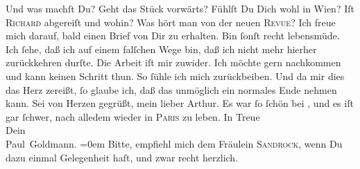 \begin{ledgroupsized}[t]{13cm}
           \pstart
           Und was machſt Du? Geht das Stück
               vorwärts? Fühlſt Du Dich wohl in Wien? Iſt \textsc{Richard} abgereiſt und
               wohin? Was hört man von der neuen \textsc{Revue}?\pend
           \pstart
           {\pb}Ich freue mich darauf, bald einen Brief von Dir zu
               erhalten. Bin ſonſt recht lebensmüde. Ich ſehe, daß ich auf einem falſchen Wege bin,
               daß ich nicht mehr hierher zurückkehren durſte. Die Arbeit iſt mir zuwider. Ich
               möchte gern nachkommen und kann keinen Schritt thun. So ſühle ich mich zurückbeiben.
               Und da mir dies das Herz zereißt, ſo glaube ich, daß das unmöglich ein normales Ende
               nehmen kann.\pend
           \pstart
           {\pb}Sei von Herzen gegrüßt, mein lieber Arthur. Es war
               ſo ſchön bei \label{K_L02614-7v}\label{K_L02614-7h}, und es iſt gar ſchwer, nach alledem wieder in \textsc{Paris} zu leben.\pend
           \pstart
           In Treue{\\[\baselineskip]} Dein{\\[\baselineskip]}\spacefill\mbox{Paul Goldmann.}\pend
           \leftskip=0em{}\pstart
           \noindent{}Bitte, empfiehl mich dem Fräulein \textsc{Sandrock}, wenn Du dazu einmal Gelegenheit haſt, und
                     \strikeout{\textcolor{gray}{zwarr}} zwar recht
                  herzlich.\pend
                     \endnumbering{}\end{ledgroupsized}\begin{anhang}\end{anhang}\newcommand{\dateiname}{L02614}\newcommand{\titel}{Paul Goldmann an Arthur Schnitzler, 21. 9. [1894]}\newcommand{\editorInnen}{Martin Anton Müller und Laura Untner}
            \footnotesize
\begin{ledgroupsized}[t]{11.5cm}
\end{ledgroupsized}
         
      